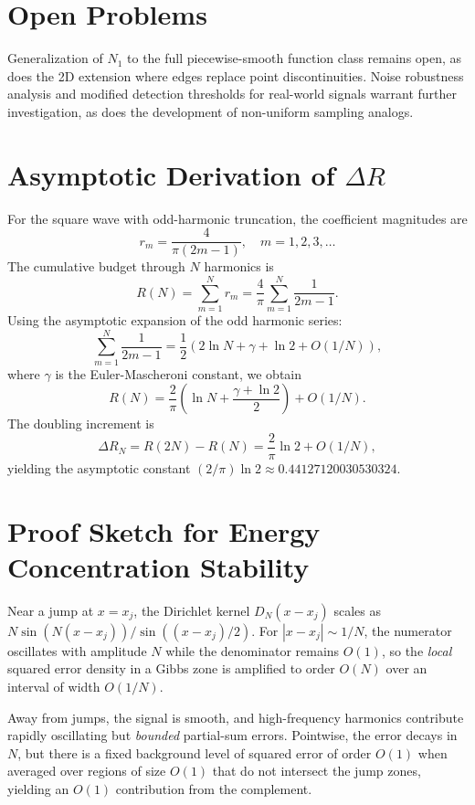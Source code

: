 \documentclass[11pt,letterpaper]{article}
\theoremstyle{remark}
\begin{document}
\section{Open Problems}

Generalization of $N_1$ to the full piecewise-smooth function class remains open, as does the 2D extension where edges replace point discontinuities. Noise robustness analysis and modified detection thresholds for real-world signals warrant further investigation, as does the development of non-uniform sampling analogs.

\appendix

\section{Asymptotic Derivation of $\Delta R$}

For the square wave with odd-harmonic truncation, the coefficient magnitudes are
\[
r_m = \frac{4}{\pi(2m - 1)}, \quad m = 1, 2, 3, \ldots
\]
The cumulative budget through $N$ harmonics is
\[
R(N) = \sum_{m=1}^{N} r_m = \frac{4}{\pi} \sum_{m=1}^{N} \frac{1}{2m - 1}.
\]
Using the asymptotic expansion of the odd harmonic series:
\[
\sum_{m=1}^{N} \frac{1}{2m - 1} = \frac{1}{2}\left( 2\ln N + \gamma + \ln 2 + O(1/N) \right),
\]
where $\gamma$ is the Euler-Mascheroni constant, we obtain
\[
R(N) = \frac{2}{\pi}\left( \ln N + \frac{\gamma + \ln 2}{2} \right) + O(1/N).
\]
The doubling increment is
\[
\Delta R_N = R(2N) - R(N) = \frac{2}{\pi} \ln 2 + O(1/N),
\]
yielding the asymptotic constant $(2/\pi)\ln 2 \approx 0.44127120030530324$.

\section{Proof Sketch for Energy Concentration Stability}

Near a jump at $x = x_j$, the Dirichlet kernel $D_N(x - x_j)$ scales as $N \sin(N(x - x_j)) / \sin((x - x_j)/2)$. For $|x - x_j| \sim 1/N$, the numerator oscillates with amplitude $N$ while the denominator remains $O(1)$, so the \emph{local} squared error density in a Gibbs zone is amplified to order $O(N)$ over an interval of width $O(1/N)$.

Away from jumps, the signal is smooth, and high-frequency harmonics contribute rapidly oscillating but \emph{bounded} partial-sum errors. Pointwise, the error decays in $N$, but there is a fixed background level of squared error of order $O(1)$ when averaged over regions of size $O(1)$ that do not intersect the jump zones, yielding an $O(1)$ contribution from the complement.
\end{document}
